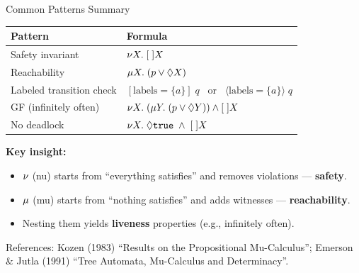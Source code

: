 \begin{frame}{Common Patterns Summary}
  \begin{center}
  \begin{tabularx}{0.95\textwidth}{lX}
    \toprule
    \textbf{Pattern} & \textbf{Formula} \\
    \midrule
    Safety invariant
      & $\nu X.\; [\;] X$ \\
    Reachability
      & $\mu X.\; (p \lor \lozenge X)$ \\
    Labeled transition check
      & $[\text{labels} = \{a\}]\; q$ ~or~ $\langle \text{labels} = \{a\} \rangle\; q$ \\
    GF (infinitely often)
      & $\nu X.\; (\mu Y.\; (p \lor \lozenge Y)) \land [\;] X$ \\
    No deadlock
      & $\nu X.\; \lozenge \texttt{true} \;\land\; [\;] X$ \\
    \bottomrule
  \end{tabularx}
  \end{center}

  \bigskip
  \textbf{Key insight:}
  \begin{itemize}
    \item $\nu$ (nu) starts from ``everything satisfies'' and removes violations --- \textbf{safety}.
    \item $\mu$ (mu) starts from ``nothing satisfies'' and adds witnesses --- \textbf{reachability}.
    \item Nesting them yields \textbf{liveness} properties (e.g., infinitely often).
  \end{itemize}

  \medskip
  {\scriptsize\color{ubaGray} References: Kozen (1983) ``Results on the Propositional Mu-Calculus''; Emerson \& Jutla (1991) ``Tree Automata, Mu-Calculus and Determinacy''.}
\end{frame}


